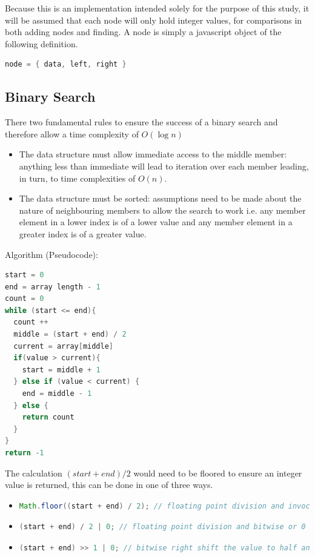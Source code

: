 \documentclass[pdftex,a4paper,10pt,titlepage]{article}
\begin{document}
Because this is an implementation intended solely for the purpose of this study, it will be assumed that each node will only hold integer values, for comparisons in both adding nodes and finding. A node is simply a javascript object of the following definition.
\begin{lstlisting}[language=java]
node = { data, left, right }
\end{lstlisting}

\subsection{Binary Search}
There two fundamental rules to ensure the success of a binary search and therefore allow a time complexity of $O(\log{}n)$
\begin{itemize}
\item The data structure must allow immediate access to the middle member: anything less than immediate will lead to iteration over each member leading, in turn, to time complexities of $O(n)$.
\item The data structure must be sorted: assumptions need to be made about the nature of neighbouring members to allow the search to work i.e. any member element in a lower index is of a lower value and any member element in a greater index is of a greater value.

\end{itemize}

Algorithm (Pseudocode):
\begin{lstlisting}[language=java]
start = 0
end = array length - 1
count = 0
while (start <= end){
  count ++
  middle = (start + end) / 2
  current = array[middle]
  if(value > current){
    start = middle + 1
  } else if (value < current) {
    end = middle - 1
  } else {
    return count
  }
}
return -1 
\end{lstlisting}
\pagebreak
The calculation $(start + end) / 2$ would need to be floored to ensure an integer value is returned, this can be done in one of three ways.

\begin{itemize}
\item \begin{lstlisting}[language=java] 
Math.floor((start + end) / 2); // floating point division and invocation of Math class. 
\end{lstlisting}

\item \begin{lstlisting}[language=java] 
(start + end) / 2 | 0; // floating point division and bitwise or 0 to drop the decimal.
\end{lstlisting}

\item \begin{lstlisting}[language=java] 
(start + end) >> 1 | 0; // bitwise right shift the value to half and and bitwise or 0 to drop the decimal. floating point division is not used therefore making this approach computationally cheaper.
\end{lstlisting}
\end{itemize}
\end{document}
